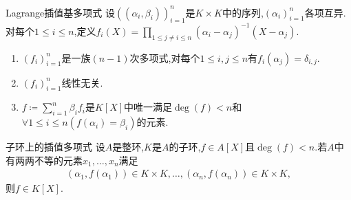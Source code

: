 \begin{proposition}{Lagrange插值基多项式}{}
	设$\left(\left(\alpha_{i},\beta_{i}\right)\right)_{i=1}^{n}$是$K\times K$中的序列,$\left(\alpha_{i}\right)_{i=1}^{n}$各项互异.对每个$1\leq i\leq n$,定义$f_{i}\left(X\right)=\prod\limits_{1\leq j\neq i\leq n}\left(\alpha_{i}-\alpha_{j}\right)^{-1}\left(X-\alpha_{j}\right)$.
	\begin{enumerate}
		\item $\left(f_{i}\right)_{i=1}^{n}$是一族$\left(n-1\right)$次多项式,对每个$1\leq i,j\leq n$有$f_{i}\left(\alpha_{j}\right)=\delta_{i,j}$.
		\item $\left(f_{i}\right)_{i=1}^{n}$线性无关.
		\item $f\coloneq\sum\limits_{i=1}^{n}\beta_{i}f_{i}$是$K\left[X\right]$中唯一满足$\deg\left(f\right)<n$和$\forall 1\leq i\leq n\left(f\left(\alpha_{i}\right)=\beta_{i}\right)$的元素.
	\end{enumerate}
\end{proposition}

\begin{corollary}{子环上的插值多项式}{}
	设$A$是整环,$K$是$A$的子环,$f\in A\left[X\right]$且$\deg\left(f\right)<n$.若$A$中有两两不等的元素$x_{1},\ldots,x_{n}$满足
	\begin{align*}
		\left(\alpha_{1},f\left(\alpha_{1}\right)\right)\in K\times K,\ldots,\left(\alpha_{n},f\left(\alpha_{n}\right)\right)\in K\times K,
	\end{align*}
	则$f\in K\left[X\right]$.
\end{corollary}









































